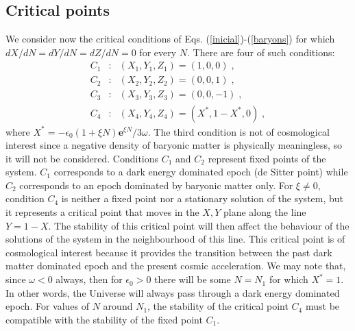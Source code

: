 \documentclass[twocolumn,preprintnumbers,amsmath,amssymb]{revtex4}
\begin{document}
\subsection{Critical points}


We consider now the critical conditions of Eqs. (\ref{inicial})-(\ref{baryons})
for which ${dX}/{dN}={dY}/{dN}={dZ}/{dN}=0$ for every $N$. There are four of such conditions:
\begin{eqnarray}
C_{1} & : & (X_{1},Y_{1},Z_{1})=(1,0,0)\;,\nonumber \\
C_{2} & : & (X_{2},Y_{2},Z_{2})=(0,0,1)\label{eq:16}\;,\\
C_{3} & : & (X_{3},Y_{3},Z_{3})=(0,0,-1)\;,\nonumber \\
C_{4} & : & (X_{4},Y_{4},Z_{4})=(X^{*},1-X^{*},0)\;,\nonumber 
\end{eqnarray}
where ${\displaystyle X^{*}=-\epsilon_{0}\left(1+\xi N\right)\mathbf{e}^{\xi N}}/{3\omega}$.
The third condition is not of cosmological interest since a negative
density of baryonic matter is physically meaningless, so it will not be considered.
Conditions $C_{1}$ and $C_{2}$ represent fixed points of the system. $C_{1}$ corresponds to 
a dark energy dominated epoch (de Sitter point) while $C_{2}$ corresponds to an epoch dominated by baryonic 
matter only. For $\xi\neq0$, condition $C_{4}$ is neither a fixed point nor a
stationary solution of the system, but it represents a critical point
that moves in the $X,Y$ plane along the line $Y=1-X$. 
The stability of this critical point will then affect the behaviour of the solutions
of the system in the neighbourhood of this line. This critical point is of cosmological interest 
because it provides the transition between the past dark matter dominated epoch and the present 
cosmic acceleration. We may note that,
since $\omega<0$ always, then for $\epsilon_{0}>0$ there will be
some $N=N_{1}$ for which $X^{*}=1$. In other words, the Universe will always pass through a dark energy dominated epoch. 
For values of $N$ around $N_{1}$, the stability of the critical point $C_{4}$ must be compatible
with the stability of the fixed point $C_{1}$.
\end{document}
